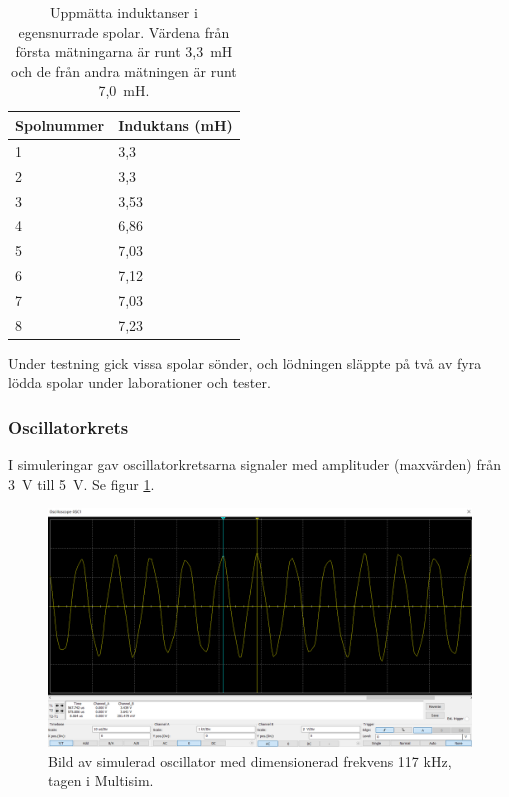 \documentclass[a4paper]{article}
\begin{document}
\begin{sloppypar}
    \begin{table}
        \begin{center}
            \caption{Uppmätta induktanser i egensnurrade spolar. Värdena från första mätningarna är runt 3,3~mH och de från andra mätningen är runt 7,0~mH.}
            \label{table:inductance}
            \begin{tabular}{| l | l |}
                \hline
                Spolnummer & Induktans (mH) \\
                \hline
                1          & 3,3            \\
                2          & 3,3            \\
                3          & 3,53           \\
                4          & 6,86           \\
                5          & 7,03           \\
                6          & 7,12           \\
                7          & 7,03           \\
                8          & 7,23           \\
                \hline
            \end{tabular}
        \end{center}
    \end{table}

    Under testning gick vissa spolar sönder, och lödningen släppte på två av fyra lödda spolar under laborationer och tester.

    \subsubsection{Oscillatorkrets}
    I simuleringar gav oscillatorkretsarna signaler med amplituder (maxvärden) från 3~V till 5~V. Se figur \ref{fig:sim-117kHz}.

    \begin{figure}[H]
        \centering
        \includegraphics[width=\textwidth]{multisim-signal-555-117kHz.png}
        \caption{Bild av simulerad oscillator med dimensionerad frekvens 117 kHz, tagen i Multisim.}
        \label{fig:sim-117kHz}
    \end{figure}


\end{sloppypar}
\end{document}
